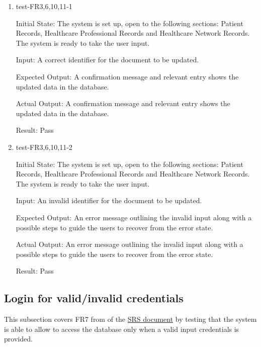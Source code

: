 \documentclass[12pt, titlepage]{article}
\begin{document}
\begin{enumerate}

  \item{test-FR3,6,10,11-1} \label{test-FR3,6,10,11-1}
  
  Initial State: The system is set up, open to the following sections: Patient Records, Healthcare Professional Records and Healthcare Network Records. The system is ready to take the user input.

  Input: A correct identifier for the document to be updated.

  Expected Output: A confirmation message and relevant entry shows the updated data in the database.

  Actual Output: A confirmation message and relevant entry shows the updated data in the database.

  Result: Pass


  \item{test-FR3,6,10,11-2} \label{test-FR3,6,10,11-2}

  Initial State: The system is set up, open to the following sections: Patient Records, Healthcare Professional Records and Healthcare Network Records. The system is ready to take the user input.

  Input: An invalid identifier for the document to be updated.

  Expected Output: An error message outlining the invalid input along with a possible steps to guide the users to recover from the error state.

  Actual Output: An error message outlining the invalid input along with a possible steps to guide the users to recover from the error state.

  Result: Pass

\end{enumerate}

\subsection{Login for valid/invalid credentials} \label{section:3.4}

This subsection covers FR7 from of the \href{https://github.com/Inreet-Kaur/capstone/blob/main/docs/SRS/SRS.pdf} {SRS document} by testing that the system is able to allow to access the database only when a valid input credentials is provided.
\end{document}
